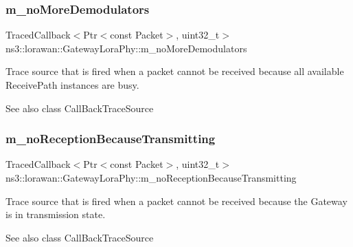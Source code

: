 \subsubsection{\texorpdfstring{m\+\_\+no\+More\+Demodulators}{m\_noMoreDemodulators}}
{\footnotesize\ttfamily Traced\+Callback$<$Ptr$<$const Packet$>$, uint32\+\_\+t$>$ ns3\+::lorawan\+::\+Gateway\+Lora\+Phy\+::m\+\_\+no\+More\+Demodulators\hspace{0.3cm}{\ttfamily [protected]}}

Trace source that is fired when a packet cannot be received because all available Receive\+Path instances are busy.

\begin{DoxySeeAlso}{See also}
class Call\+Back\+Trace\+Source 
\end{DoxySeeAlso}
\mbox{\label{classns3_1_1lorawan_1_1GatewayLoraPhy_a69dbd2dafaea10f75115f2eb38ae06dd}} 
\subsubsection{\texorpdfstring{m\+\_\+no\+Reception\+Because\+Transmitting}{m\_noReceptionBecauseTransmitting}}
{\footnotesize\ttfamily Traced\+Callback$<$Ptr$<$const Packet$>$, uint32\+\_\+t$>$ ns3\+::lorawan\+::\+Gateway\+Lora\+Phy\+::m\+\_\+no\+Reception\+Because\+Transmitting\hspace{0.3cm}{\ttfamily [protected]}}

Trace source that is fired when a packet cannot be received because the Gateway is in transmission state.

\begin{DoxySeeAlso}{See also}
class Call\+Back\+Trace\+Source 
\end{DoxySeeAlso}
\mbox{\label{classns3_1_1lorawan_1_1GatewayLoraPhy_a4cf88e2deb82b7739dd028c6122e1ad4}} 
